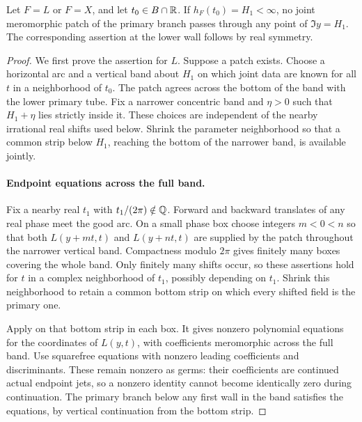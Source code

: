 \begin{theorem}
\label{thm:no-patch}
Let \(F=L\) or \(F=X\), and let \(t_0\in B\cap\mathbb R\).
If \(h_F(t_0)=H_1<\infty\), no joint meromorphic patch of the
primary branch passes through any point of \(\Im y=H_1\).
The corresponding assertion at the lower wall follows by
real symmetry.
\end{theorem}

\begin{proof}
We first prove the assertion for \(L\).  Suppose a patch exists.
Choose a horizontal arc and a vertical band about \(H_1\) on
which joint data are known for all \(t\) in a neighborhood of
\(t_0\).  The patch agrees across the bottom of the band with
the lower primary tube.  Fix a narrower concentric band and
\(\eta>0\) such that \(H_1+\eta\) lies strictly inside it.
These choices are independent of the nearby irrational real
shifts used below.  Shrink the parameter neighborhood so
that a common strip below \(H_1\), reaching the bottom of
the narrower band, is available jointly.

\paragraph{Endpoint equations across the full band.}
Fix a nearby real \(t_1\) with \(t_1/(2\pi)\notin\mathbb Q\).
Forward and backward translates of any real phase meet the
good arc.  On a small phase box choose integers \(m<0<n\)
so that both \(L(y+mt,t)\) and \(L(y+nt,t)\) are supplied
by the patch throughout the narrower vertical band.
Compactness modulo \(2\pi\) gives finitely many boxes
covering the whole band.  Only finitely many shifts occur,
so these assertions hold for \(t\) in a complex neighborhood
of \(t_1\), possibly depending on \(t_1\).  Shrink this
neighborhood to retain a common bottom strip on which
every shifted field is the primary one.

Apply  on that bottom strip in each box.
It gives nonzero polynomial equations for the coordinates
of \(L(y,t)\), with coefficients meromorphic across the
full band.  Use squarefree equations with nonzero leading
coefficients and discriminants.  These remain nonzero as
germs: their coefficients are continued actual endpoint
jets, so a nonzero identity cannot become identically zero
during continuation.  The primary branch below any first
wall in the band satisfies the equations, by vertical
continuation from the bottom strip.


\end{proof}
